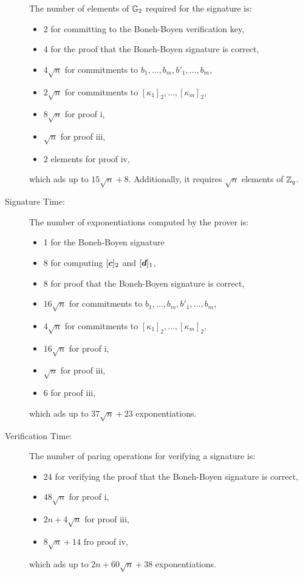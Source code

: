 \begin{description}
The number of elements of $\mathbb{G}_2$ required  for the signature is:
\begin{itemize}
\item 2 for committing to the Boneh-Boyen verification key,
\item 4 for the proof that the Boneh-Boyen signature is correct,
\item $4\sqrt{n}$ for commitments to $b_1,\ldots,b_m,b'_1,\ldots,b_m$,
\item $2\sqrt{n}$ for commitments to $[\kappa_1]_2,\ldots,[\kappa_m]_2$,
\item $8\sqrt{n}$ for proof i,
\item $\sqrt{n}$ for proof iii,
\item $2$ elements for proof iv,
\end{itemize}
which ads up to $15\sqrt{n}+8$. Additionally, it requires $\sqrt{n}$ elements of $\mathbb{Z}_q$.
\item[Signature Time:] The number of exponentiations computed by the prover is:
\begin{itemize}
\item 1 for the Boneh-Boyen signature
\item 8 for computing $[{\boldsymbol{c}}]_2$ and $[{\boldsymbol{d}}]_1$,
\item 8 for proof that the Boneh-Boyen signature is correct,
\item $16\sqrt{n}$ for commitments to $b_1,\ldots,b_m,b'_1,\ldots,b_m$,
\item $4\sqrt{n}$ for commitments to $[\kappa_1]_2,\ldots,[\kappa_m]_2$,
\item $16\sqrt{n}$ for proof i,
\item $\sqrt{n}$ for proof iii,
\item $6$ for proof iii,
\end{itemize}
which ads up to $37\sqrt{n}+23$ exponentiations.
\item[Verification Time:] The number of paring operations for verifying a signature is:
\begin{itemize}
\item 24 for verifying the proof that the Boneh-Boyen signature is correct,
\item $48\sqrt{n}$ for proof i,
\item $2n+4\sqrt{n}$ for proof iii,
\item $8\sqrt{n} + 14$ fro proof iv,
\end{itemize}
which ads up to $2n + 60\sqrt{n}+38$ exponentiations.
\end{description}